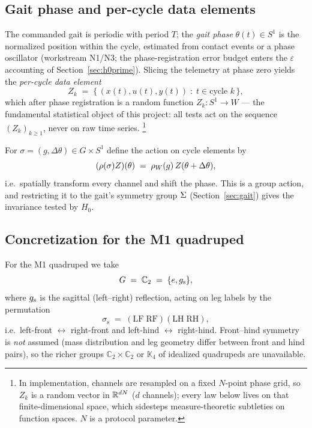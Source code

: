 \subsection{Gait phase and per-cycle data elements}
\label{sec:cycles}

The commanded gait is periodic with period $T$; the \emph{gait phase}
$\theta(t) \in S^1$ is the normalized position within the cycle, estimated from
contact events or a phase oscillator (workstream N1/N3; the phase-registration
error budget enters the $\varepsilon$ accounting of
Section~\ref{sec:h0prime}). Slicing the telemetry at phase zero yields the
\emph{per-cycle data element}
\[
  Z_k \;=\; \bigl\{\, (x(t), u(t), y(t)) \;:\; t \in \text{cycle } k \,\bigr\},
\]
which after phase registration is a random function
$Z_k : S^1 \to W$ --- the fundamental statistical object of this project: all
tests act on the sequence $(Z_k)_{k\ge 1}$, never on raw time series.%
\footnote{In implementation, channels are resampled on a fixed $N$-point phase
grid, so $Z_k$ is a random vector in $\mathbb{R}^{dN}$ ($d$ channels); every law below
lives on that finite-dimensional space, which sidesteps measure-theoretic
subtleties on function spaces. $N$ is a protocol parameter.}

For $\sigma = (g, \Delta\theta) \in G \times S^1$ define the action on cycle
elements by
\begin{equation}
  \label{eq:cycle-action}
  (\rho(\sigma) Z)(\theta) \;=\; \rho_{W}(g)\, Z(\theta + \Delta\theta),
\end{equation}
i.e.\ spatially transform every channel and shift the phase. This is a group
action, and restricting it to the gait's symmetry group $\Sigma$
(Section~\ref{sec:gait}) gives the invariance tested by $H_0$.

\subsection{Concretization for the M1 quadruped}
\label{sec:m1}

For the M1 quadruped we take
\[
  G \;=\; \mathbb{C}_2 \;=\; \{e, g_{\mathrm{s}}\},
\]
where $g_{\mathrm{s}}$ is the sagittal (left--right) reflection, acting on leg labels by
the permutation
\[
  \sigma_{\mathrm{s}} \;=\; (\mathrm{LF}\;\mathrm{RF})(\mathrm{LH}\;\mathrm{RH}),
\]
i.e.\ left-front $\leftrightarrow$ right-front and left-hind
$\leftrightarrow$ right-hind. Front--hind symmetry is \emph{not} assumed (mass
distribution and leg geometry differ between front and hind pairs), so the
richer groups $\mathbb{C}_2\times\mathbb{C}_2$ or $\mathbb{K}_4$ of idealized
quadrupeds are unavailable.

